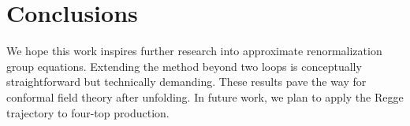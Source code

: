 \section{Conclusions}\label{sec:conclusions}

We hope this work inspires further research into approximate
renormalization group equations. Extending the method beyond two loops
is conceptually straightforward but technically demanding. These results
pave the way for conformal field theory after unfolding. In future work,
we plan to apply the Regge trajectory to four-top production.

